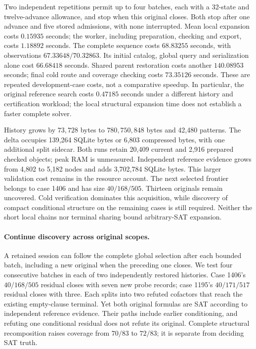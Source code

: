 \documentclass[11pt,a4paper]{article}
\numberwithin{equation}{section}
\theoremstyle{plain}
\theoremstyle{definition}
\theoremstyle{remark}
\begin{document}
Two independent repetitions permit up to four batches, each with a 32-state
and twelve-advance allowance, and stop when this original closes. Both stop
after one advance and five stored admissions, with none interrupted. Mean
local expansion costs $0.15935$ seconds; the worker, including preparation,
checking and export, costs $1.18892$ seconds. The complete sequence costs
$68.83255$ seconds, with observations $67.33648/70.32863$. Its initial catalog,
global query and serialization alone cost $66.68418$ seconds. Shared parent
restoration costs another $140.08953$ seconds; final cold route and coverage
checking costs $73.35126$ seconds. These are repeated development-case costs,
not a comparative speedup. In particular, the original reference search costs
$0.47185$ seconds under a different history and certification workload; the
local structural expansion time does not establish a faster complete solver.

History grows by $73{,}728$ bytes to $780{,}750{,}848$ bytes and 42,480 patterns.
The delta occupies 139,264 SQLite bytes or 6,803 compressed bytes, with one
additional split sidecar. Both runs retain 20,409 current and 2,916 prepared
checked objects; peak RAM is unmeasured. Independent reference evidence grows
from 4,802 to 5,182 nodes and adds 3,702,784 SQLite bytes. This larger validation
cost remains in the resource account. The next selected frontier belongs to
case 1406 and has size $40/168/505$. Thirteen originals remain uncovered.
Cold verification dominates this acquisition, while discovery of compact
conditional structure on the remaining cases is still required. Neither the
short local chains nor terminal sharing bound arbitrary-SAT expansion.

\paragraph{Continue discovery across original scopes.}
A retained session can follow the complete global selection after each bounded
batch, including a new original when the preceding one closes. We test four
consecutive batches in each of two independently restored histories. Case 1406's
$40/168/505$ residual closes with seven new probe records; case 1195's
$40/171/517$ residual closes with three. Each splits into two refuted cofactors
that reach the existing empty-clause terminal. Yet both original formulas are
SAT according to independent reference evidence. Their paths include earlier
conditioning, and refuting one conditional residual does not refute its
original. Complete structural recomposition raises coverage from $70/83$ to
$72/83$; it is separate from deciding SAT truth.
\end{document}
